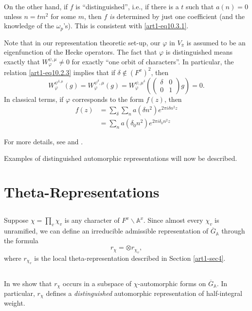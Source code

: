 On the other hand, if $f$ is ``distinguished'', i.e., if there is a $t$ such that $a(n)=0$ unless $n=tm^{2}$ for some $m$, then $f$ {\em is} determined by just one coefficient (and the knowledge of the $\omega_{p}$'s). This is consistent with \eqref{art1-eq10.3.1}.

Note that in our representation theoretic set-up, our $\varphi$ in $V_{\overline{\pi}}$ is assumed to be an eigenfunction of the Hecke operators. The fact that $\varphi$ is distinguished means exactly that $W^{\psi,\mu}_{\varphi}\neq 0$ for exactly ``one orbit of characters''. In particular, the relation \eqref{art1-eq10.2.3} implies that if $\delta\not\in (F^{x})^{2}$, then
$$
W^{\psi^{\delta,\mu}}_{\varphi}(g)=W^{\psi^{\delta},\mu}_{\varphi}(g)=W^{\psi,\mu^{\delta}}_{\varphi}\left(\left(\begin{matrix} \delta & 0\\ 0 & 1\end{matrix}\right)g\right)=0.
$$
In classical terms, if $\varphi$ corresponds to the form $f(z)$, then 
\begin{align*}
f(z) &= \sum\limits_{\delta}\sum\limits_{n}a(\delta n^{2})e^{2\pi i\delta n^{2}z}\\
&= \sum\limits_{n}a(\delta_{0}n^{2})e^{2\pi i\delta_{0}n^{2}z}
\end{align*}

For more details, see \cite{GePS2} and \cite{Shim}.

Examples of distinguished automorphic representations will now be described.

\section{Theta-Representations}\label{art1-sec11}

\subsection{}\label{art1-sec11.1}
Suppose $\chi=\prod\limits_{v}\chi_{v}$ is any character of $F^{x}\backslash \mathbb{A}^{x}$. Since almost every $\chi_{v}$ is unramified, we can define an irreducible admissible representation of $\overline{G}_{\mathbb{A}}$ through the formula
$$
r_{\chi}=\otimes r_{\chi_{v}},
$$
where $r_{\chi_{v}}$ is the local theta-representation described in Section \ref{art1-sec4}.

\subsection{}\label{art1-sec11.2}
In \cite{GePS2} we show that $r_{\chi}$ occurs in a subspace of $\chi$-automorphic forms on $\overline{G}_{\mathbb{A}}$. In particular, $r_{\chi}$ defines a {\em distinguished} automorphic representation of half-integral weight.

